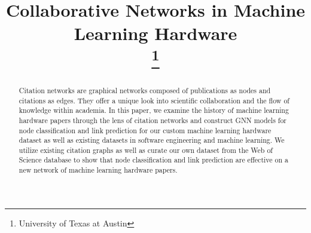 \documentclass[conference]{IEEEtran}
\begin{document}
\title{Collaborative Networks in Machine Learning Hardware\\
\thanks{University of Texas at Austin}
}

\author{
\and
{}
\and
{}
\and
{}
\and
{}
\and
{}
}

\maketitle

\begin{abstract}
Citation networks are graphical networks composed of publications as nodes and citations as edges. 
They offer a unique look into scientific collaboration and the flow of knowledge within academia. 
In this paper, we examine the history of machine learning hardware papers through the lens of citation 
networks and construct GNN models for node classification and link prediction for our custom machine 
learning hardware dataset as well as existing datasets in software engineering and machine learning. 
We utilize existing citation graphs as well as curate our own dataset from the Web of Science database 
to show that node classification and link prediction are effective on a new network of machine learning 
hardware papers.
\end{abstract}
\end{document}

